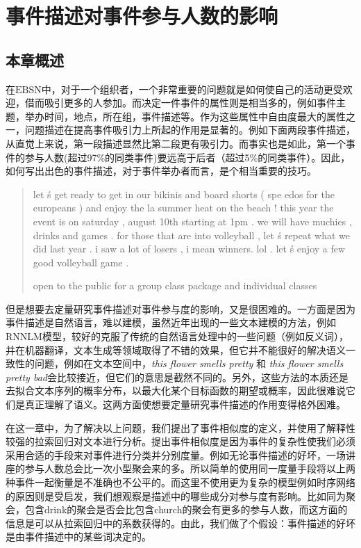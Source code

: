 \documentclass[12pt]{template}
\begin{document}
\section{事件描述对事件参与人数的影响} 
\subsection{本章概述} 
在$\mathrm{EBSN}$中，对于一个组织者，一个非常重要的问题就是如何使自己的活动更受欢迎，借而吸引更多的人参加。而决定一件事件的属性则是相当多的，例如事件主题，举办时间，地点，所在组，事件描述等。作为这些属性中自由度最大的属性之一，问题描述在提高事件吸引力上所起的作用是显著的。例如下面两段事件描述，从直觉上来说，第一段描述显然比第二段更有吸引力。而事实也是如此，第一个事件的参与人数(超过97\%的同类事件)要远高于后者（超过5\%的同类事件）。因此，如何写出出色的事件描述，对于事件举办者而言，是个相当重要的技巧。
 
\begin{quotation}
  let  \'s get ready to get in our bikinis and board shorts  (  spe
  edos for the europeans  )  and enjoy the la summer heat on the beach
  !  this year the event is on saturday  ,  august 10th starting at 
  1pm . we will have muchies  ,  drinks and games . for those that 
  are into volleyball  ,  let  \'s repeat what we did last year . 
  i saw a lot of losers  ,  i mean winners. lol . let  \'s enjoy 
  a few good volleyball game .
    
  open to the public for a group class package and individual classes
\end{quotation}

但是想要去定量研究事件描述对事件参与度的影响，又是很困难的。一方面是因为事件描述是自然语言，难以建模，虽然近年出现的一些文本建模的方法，例如RNNLM模型，较好的克服了传统的自然语言处理中的一些问题（例如反义词），并在机器翻译，文本生成等领域取得了不错的效果，但它并不能很好的解决语义一致性的问题，例如在文本空间中，\textit{this flower smells pretty} 和 \textit{this flower smells pretty bad}会比较接近，但它们的意思是截然不同的。另外，这些方法的本质还是去拟合文本序列的概率分布，以最大化某个目标函数的期望或概率，因此很难说它们是真正理解了语义。这两方面使想要定量研究事件描述的作用变得格外困难。

在这一章中，为了解决以上问题，我们提出了事件相似度的定义，并使用了解释性较强的拉索回归对文本进行分析。提出事件相似度是因为事件的复杂性使我们必须采用合适的手段来对事件进行分类并分别度量。例如无论事件描述的好坏，一场讲座的参与人数总会比一次小型聚会来的多。所以简单的使用同一度量手段将以上两种事件一起衡量是不准确也不公平的。而这里不使用更为复杂的模型例如时序网络的原因则是受\citep{noauthor_predicting_nodate}启发，我们想观察是描述中的哪些成分对参与度有影响。比如同为聚会，包含drink的聚会是否会比包含church的聚会有更多的参与人数，而这方面的信息是可以从拉索回归中的系数获得的。由此，我们做了个假设：事件描述的好坏是由事件描述中的某些词决定的。
\end{document}
